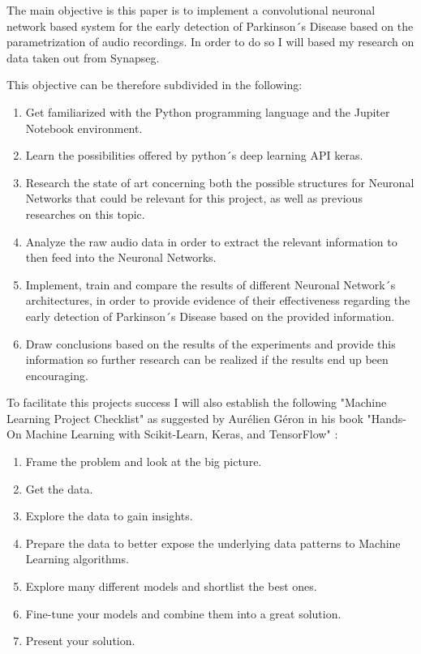 \documentclass[12pt, a4paper]{article}
\begin{document}
	The main objective is this paper is to implement a convolutional neuronal network based system for the early detection of Parkinson´s Disease based on the parametrization of audio recordings. In order to do so I will based my research on data taken out from Synapseg.
	
	This objective can be therefore subdivided in the following:
	
	\begin{enumerate}

		\item Get familiarized with the Python programming language and the Jupiter Notebook environment.
		
		\item Learn the possibilities offered by python´s deep learning API keras.
		
		\item Research the state of art concerning both the possible structures for Neuronal Networks that could be relevant for this project, as well as previous researches on this topic.
		
		\item Analyze the raw audio data in order to extract the relevant information to then feed into the Neuronal Networks.
		
		\item Implement, train and compare the results of different Neuronal Network´s architectures, in order to provide evidence of their effectiveness regarding the early detection of Parkinson´s Disease based on the provided information.
		
		\item Draw conclusions based on the results of the experiments and provide this information so further research can be realized if the results end up been encouraging.
		
	\end{enumerate}

	To facilitate this projects success I will also establish the following "Machine Learning Project Checklist" as suggested by Aurélien Géron in his book "Hands-On Machine Learning with Scikit-Learn, Keras, and TensorFlow" \cite{handsonmachinelearning}:
	
	 \begin{enumerate}
	 	\item Frame the problem and look at the big picture.
	 	
	 	\item Get the data.
	 	
	 	\item Explore the data to gain insights.
	 	
	 	\item Prepare the data to better expose the underlying data patterns to Machine Learning algorithms.
	 	
	 	\item Explore many different models and shortlist the best ones.
	 	
	 	\item Fine-tune your models and combine them into a great solution.
	 	
	 	\item Present your solution.
	 \end{enumerate}
	
\end{document}
